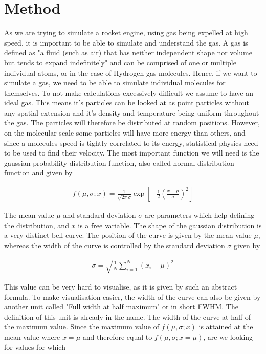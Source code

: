 \documentclass[reprint,english,notitlepage]{revtex4-2}
\begin{document}
\section{Method}
As we are trying to simulate a rocket engine, using gas being expelled at high speed, it is important to be able to simulate and understand the gas.
A gas is defined as "a fluid (such as air) that has neither independent shape nor volume but tends to expand indefinitely"
and can be comprised of one or multiple individual atoms, or in the case of Hydrogen gas molecules.
Hence, if we want to simulate a gas, we need to be able to simulate individual molecules for themselves.
To not make calculations excessively difficult we assume to have an ideal gas.
This means it's particles can be looked at as point particles without any spatial extension and it's density and temperature being uniform throughout the gas.
The particles will therefore be distributed at random positions.
However, on the molecular scale some particles will have more energy than others, and since a molecules speed is tightly correlated to its energy, statistical physics need to be used to find their velocity.
The most important function we will need is the gaussian probability distribution function, also called normal distribution function and given by

\begin{align}
    f(\mu, \sigma; x) = \frac{1}{\sqrt{2\pi}\sigma} \exp \left[-\frac{1}{2}\left(\frac{x-\mu}{\sigma}\right)^2 \right] \label{Normal_Distribution}
\end{align}

The mean value $\mu$ and standard deviation $\sigma$ are parameters which help defining the distribution, and $x$ is a free variable.
The shape of the gaussian distribution is a very distinct bell curve. The position of the curve is given by the mean value $\mu$, whereas the width of the curve is controlled by the standard deviation $\sigma$ given by

\begin{align*}
    \sigma = \sqrt{\frac{1}{N}\sum_{i = 1}^{N} \left(x_i-\mu \right)^2}
\end{align*}

This value can be very hard to visualise, as it is given by such an abstract formula.
To make visualisation easier, the width of the curve can also be given by another unit called "Full width at half maximum" or in short FWHM.
The definition of this unit is already in the name. The width of the curve at half of the maximum value.
Since the maximum value of $f(\mu, \sigma; x)$ is attained at the mean value where $x=\mu$ and therefore equal to $f(\mu, \sigma; x=\mu)$, are we looking for values for which
\end{document}
